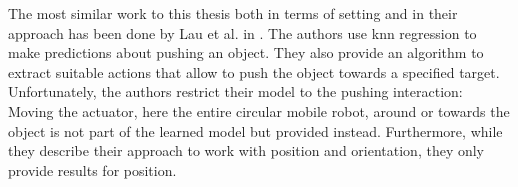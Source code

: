 The most similar work to this thesis both in terms of setting and in their approach has been done by 
Lau et al. in \cite{pushing}. The authors use \gls{knn} regression to make predictions about pushing an object. They also provide an algorithm to extract suitable actions that allow to push the object towards a specified target. Unfortunately, the authors restrict their model to the pushing interaction: Moving the actuator, here the entire circular mobile robot, around or towards the object is not part of the learned model but provided instead. Furthermore, while they describe their approach to work with position and orientation, they only provide results for position. 


